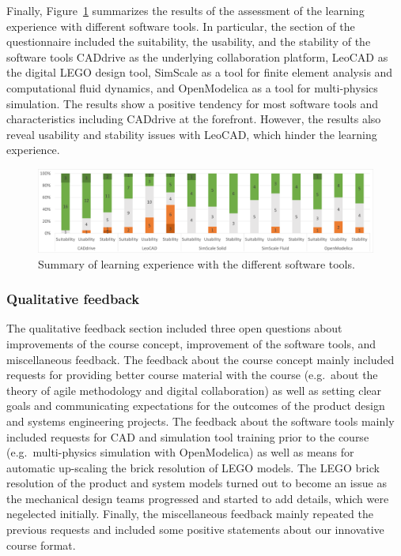 \documentclass{PDS}
\begin{document}
Finally, Figure~\ref{fig:after-software} summarizes the results of the assessment of the learning experience with different software tools.
In particular, the section of the questionnaire included the suitability, the usability, and the stability of the software tools CADdrive as the underlying collaboration platform, LeoCAD as the digital LEGO design tool, SimScale as a tool for finite element analysis and computational fluid dynamics, and OpenModelica as a tool for multi-physics simulation.
The results show a positive tendency for most software tools and characteristics including CADdrive at the forefront.
However, the results also reveal usability and stability issues with LeoCAD, which hinder the learning experience.

\begin{figure}[htbp]
    \centering
    \includegraphics[width=\textwidth]{./diagrams/after-software.png}
    \caption{Summary of learning experience with the different software tools.}
    \label{fig:after-software}
\end{figure}

\subsubsection{Qualitative feedback}
\label{sec:qualitative}

The qualitative feedback section included three open questions about improvements of the course concept, improvement of the software tools, and miscellaneous feedback.
The feedback about the course concept mainly included requests for providing better course material with the course (e.g.\ about the theory of agile methodology and digital collaboration) as well as setting clear goals and communicating expectations for the outcomes of the product design and systems engineering projects.
The feedback about the software tools mainly included requests for CAD and simulation tool training prior to the course (e.g.\ multi-physics simulation with OpenModelica) as well as means for automatic up-scaling the brick resolution of LEGO models.
The LEGO brick resolution of the product and system models turned out to become an issue as the mechanical design teams progressed and started to add details, which were negelected initially.
Finally, the miscellaneous feedback mainly repeated the previous requests and included some positive statements about our innovative course format.
\end{document}
